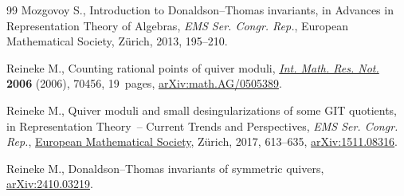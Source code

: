 \begin{thebibliography}{99}
Mozgovoy S., Introduction to {D}onaldson--{T}homas invariants, in Advances in
 {R}epresentation {T}heory of {A}lgebras, \textit{EMS Ser. Congr. Rep.}, European
 Mathematical Society, Z\"urich, 2013, 195--210.

Reineke M., Counting rational points of quiver moduli,
 \href{https://doi.org/10.1155/IMRN/2006/70456}{\textit{Int. Math. Res. Not.}}
 \textbf{2006} (2006), 70456, 19~pages,
 \href{http://arxiv.org/abs/math.AG/0505389}{arXiv:math.AG/0505389}.

Reineke M., Quiver moduli and small desingularizations of some {GIT} quotients,
 in Representation {T}heory~-- {C}urrent {T}rends and {P}erspectives, \textit{EMS Ser.
 Congr. Rep.}, \href{https://doi.org/10.4171/171-1/21}{European Mathematical
 Society}, Z\"urich, 2017, 613--635,
 \href{http://arxiv.org/abs/1511.08316}{arXiv:1511.08316}.

Reineke M., Donaldson--{T}homas invariants of symmetric quivers,
 \href{http://arxiv.org/abs/2410.03219}{arXiv:2410.03219}.

\end{thebibliography}
